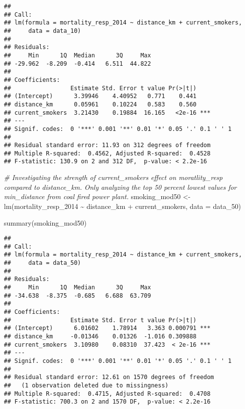 \documentclass[
]{article}
\newenvironment{Shaded}{\begin{snugshade}}{\end{snugshade}}
\newcommand{\AttributeTok}[1]{\textcolor[rgb]{0.77,0.63,0.00}{#1}}
\newcommand{\CommentTok}[1]{\textcolor[rgb]{0.56,0.35,0.01}{\textit{#1}}}
\newcommand{\FunctionTok}[1]{\textcolor[rgb]{0.00,0.00,0.00}{#1}}
\newcommand{\NormalTok}[1]{#1}
\newcommand{\OtherTok}[1]{\textcolor[rgb]{0.56,0.35,0.01}{#1}}
\newcommand{\SpecialCharTok}[1]{\textcolor[rgb]{0.00,0.00,0.00}{#1}}
\begin{document}
\begin{verbatim}
## 
## Call:
## lm(formula = mortality_resp_2014 ~ distance_km + current_smokers, 
##     data = data_10)
## 
## Residuals:
##     Min      1Q  Median      3Q     Max 
## -29.962  -8.209  -0.414   6.511  44.822 
## 
## Coefficients:
##                 Estimate Std. Error t value Pr(>|t|)    
## (Intercept)      3.39946    4.40952   0.771    0.441    
## distance_km      0.05961    0.10224   0.583    0.560    
## current_smokers  3.21430    0.19884  16.165   <2e-16 ***
## ---
## Signif. codes:  0 '***' 0.001 '**' 0.01 '*' 0.05 '.' 0.1 ' ' 1
## 
## Residual standard error: 11.93 on 312 degrees of freedom
## Multiple R-squared:  0.4562, Adjusted R-squared:  0.4528 
## F-statistic: 130.9 on 2 and 312 DF,  p-value: < 2.2e-16
\end{verbatim}

\begin{Shaded}
\begin{Highlighting}[]
\CommentTok{\# Investigating the strength of current\_smokers effect on moratlity\_resp compared to distance\_km. Only analyzing the top 50 percent lowest values for min\_distance from coal fired power plant. }
\NormalTok{smoking\_mod50 }\OtherTok{\textless{}{-}} \FunctionTok{lm}\NormalTok{(mortality\_resp\_2014 }\SpecialCharTok{\textasciitilde{}}\NormalTok{ distance\_km }\SpecialCharTok{+}\NormalTok{ current\_smokers, }\AttributeTok{data =}\NormalTok{ data\_50)}

\FunctionTok{summary}\NormalTok{(smoking\_mod50)}
\end{Highlighting}
\end{Shaded}

\begin{verbatim}
## 
## Call:
## lm(formula = mortality_resp_2014 ~ distance_km + current_smokers, 
##     data = data_50)
## 
## Residuals:
##     Min      1Q  Median      3Q     Max 
## -34.638  -8.375  -0.685   6.688  63.709 
## 
## Coefficients:
##                 Estimate Std. Error t value Pr(>|t|)    
## (Intercept)      6.01602    1.78914   3.363 0.000791 ***
## distance_km     -0.01346    0.01326  -1.016 0.309888    
## current_smokers  3.10980    0.08310  37.423  < 2e-16 ***
## ---
## Signif. codes:  0 '***' 0.001 '**' 0.01 '*' 0.05 '.' 0.1 ' ' 1
## 
## Residual standard error: 12.61 on 1570 degrees of freedom
##   (1 observation deleted due to missingness)
## Multiple R-squared:  0.4715, Adjusted R-squared:  0.4708 
## F-statistic: 700.3 on 2 and 1570 DF,  p-value: < 2.2e-16
\end{verbatim}
\end{document}
